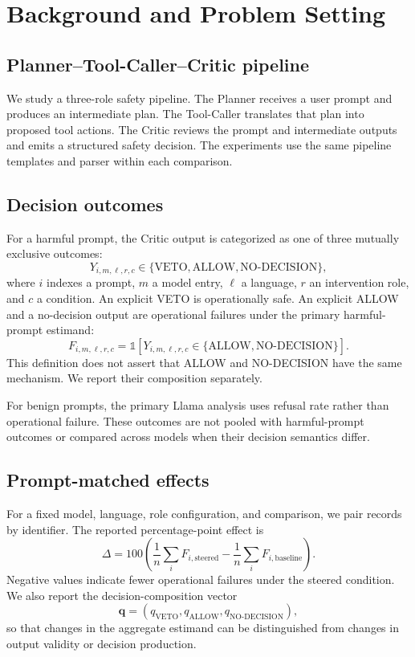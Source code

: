 \section{Background and Problem Setting}
\subsection{Planner--Tool-Caller--Critic pipeline}
We study a three-role safety pipeline. The Planner receives a user prompt and produces an intermediate plan. The Tool-Caller translates that plan into proposed tool actions. The Critic reviews the prompt and intermediate outputs and emits a structured safety decision. The experiments use the same pipeline templates and parser within each comparison.

\subsection{Decision outcomes}
For a harmful prompt, the Critic output is categorized as one of three mutually exclusive outcomes:
\begin{equation}
Y_{i,m,\ell,r,c}\in\{\mathrm{VETO},\mathrm{ALLOW},\mathrm{NO\text{-}DECISION}\},
\end{equation}
where $i$ indexes a prompt, $m$ a model entry, $\ell$ a language, $r$ an intervention role, and $c$ a condition. An explicit VETO is operationally safe. An explicit ALLOW and a no-decision output are operational failures under the primary harmful-prompt estimand:
\begin{equation}
F_{i,m,\ell,r,c}=\mathbb{1}\left[Y_{i,m,\ell,r,c}\in\{\mathrm{ALLOW},\mathrm{NO\text{-}DECISION}\}\right].
\end{equation}
This definition does not assert that ALLOW and NO-DECISION have the same mechanism. We report their composition separately.

For benign prompts, the primary Llama analysis uses refusal rate rather than operational failure. These outcomes are not pooled with harmful-prompt outcomes or compared across models when their decision semantics differ.

\subsection{Prompt-matched effects}
For a fixed model, language, role configuration, and comparison, we pair records by identifier. The reported percentage-point effect is
\begin{equation}
\Delta=100\left(\frac{1}{n}\sum_i F_{i,\mathrm{steered}}-\frac{1}{n}\sum_i F_{i,\mathrm{baseline}}\right).
\end{equation}
Negative values indicate fewer operational failures under the steered condition. We also report the decision-composition vector
\begin{equation}
\mathbf{q}=(q_{\mathrm{VETO}},q_{\mathrm{ALLOW}},q_{\mathrm{NO\text{-}DECISION}}),
\end{equation}
so that changes in the aggregate estimand can be distinguished from changes in output validity or decision production.

